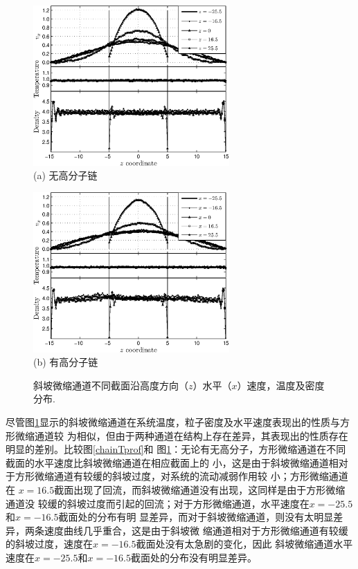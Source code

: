 \documentclass[twoside,12pt]{article}
\begin{document}
\begin{figure}[!htb]
\centering
\begin{minipage}[c]{0.5\textwidth}
\centering
\includegraphics[width=7.5cm]{./figures/Yprof.eps}\\
\small (a) 无高分子链
\end{minipage}%
\begin{minipage}[c]{0.5\textwidth}
\centering
\includegraphics[width=7.5cm]{./figures/chainYprof.eps}\\
\small (b) 有高分子链
\end{minipage}
\caption{\label{chainYprof}\small 斜坡微缩通道不同截面沿高度方向（$z$）水平（$x$）速度，温度及密度分布.}
\end{figure}

尽管图\ref{chainYprof}显示的斜坡微缩通道在系统温度，粒子密度及水平速度表现出的性质与方形微缩通道较
为相似，但由于两种通道在结构上存在差异，其表现出的性质存在明显的差别。比较图\ref{chainTprof}和
图\ref{chainYprof}：无论有无高分子，方形微缩通道在不同截面的水平速度比斜坡微缩通道在相应截面上的
小，这是由于斜坡微缩通道相对于方形微缩通道有较缓的斜坡过度，对系统的流动减弱作用较
小；方形微缩通道在 $x=16.5$截面出现了回流，而斜坡微缩通道没有出现，这同样是由于方形微缩通道没
较缓的斜坡过度而引起的回流；对于方形微缩通道，水平速度在$x=-25.5$和$x=-16.5$截面处的分布有明
显差异，而对于斜坡微缩通道，则没有太明显差异，两条速度曲线几乎重合，这是由于斜坡微
缩通道相对于方形微缩通道有较缓的斜坡过度，速度在$x=-16.5$截面处没有太急剧的变化，因此
斜坡微缩通道水平速度在$x=-25.5$和$x=-16.5$截面处的分布没有明显差异。
\end{document}
